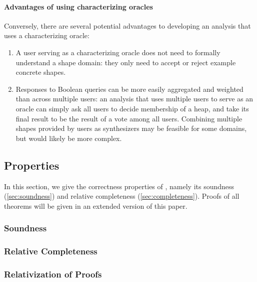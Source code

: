 \paragraph{Advantages of using characterizing oracles}
%
Conversely, there are several potential advantages to developing an
analysis that uses a characterizing oracle:
%
\begin{enumerate}
\item
  A user serving as a characterizing oracle does not need to formally
  understand a shape domain: they only need to accept or reject
  example concrete shapes.
\item
  Responses to Boolean queries can be more easily aggregated and
  weighted than across multiple users: an analysis that uses multiple
  users to serve as an oracle can simply ask all users to decide
  membership of a heap, and take its final result to be the result of
  a vote among all users.
  Combining multiple shapes provided by users as synthesizers may be
  feasible for some domains, but would likely be more complex.
\end{enumerate}

\subsection{\verifier Properties}
\label{sec:properties}
%
In this section, we give the correctness properties of \verifier,
namely its soundness (\autoref{sec:soundness}) and relative
completeness (\autoref{sec:completeness}).
%
Proofs of all theorems will be given in an extended version of this
paper.

\subsubsection{Soundness}
\label{sec:soundness}
%

\subsubsection{Relative Completeness}
\label{sec:completeness}

\subsubsection{Relativization of Proofs}
\label{sec:relativization}

